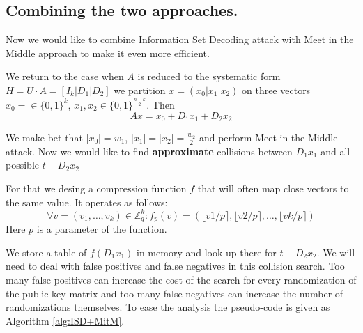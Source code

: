 \documentclass[12pt]{article}
\newcommand{\ZZ}{\mathbb{Z}}
\begin{document}
\subsection{Combining the two approaches.}

Now we would like to combine Information Set Decoding attack with Meet in the Middle approach to make it even more efficient.

We return to the case when $A$ is reduced to the systematic form $H = U \cdot A = [I_{k}| D_1 | D_2]$ we partition $x = (x_0 |x_1 |x_2)$ on three vectors $x_0 = \in \{0,1\}^{k}$, $x_1,x_2 \in \{0,1\}^{\frac{n-k}{2}}$. Then
\[
  Ax = x_0 + D_1x_1 + D_2x_2
\]

We make bet that $|x_0| = w_1$, $|x_1| = |x_2| = \frac{w_2}{2}$ and perform Meet-in-the-Middle attack. Now we would like to find \textbf{approximate} collisions between $D_1x_1$ and all possible $t - D_2x_2$

For that we desing a compression function $f$ that will often map close vectors to the same value. It operates as follows:
\[
\forall v = (v_1, \dots , v_k)\in \ZZ_{q}^{k}: f_{p}(v) = (\lfloor v1/p \rceil, \lfloor v2/p \rceil, \dots, \lfloor vk/p \rceil)
\]
Here $p$ is a parameter of the function.

We store a table of $f(D_1x_1)$ in memory and look-up there for $t - D_2x_2$. We will need to deal with false positives and false negatives in this collision search. Too many false positives can increase the cost of the search for every randomization of the public key matrix and too many false negatives can increase the number of randomizations themselves. To ease the analysis the pseudo-code is given as Algorithm \ref{alg:ISD+MitM}.
\end{document}
